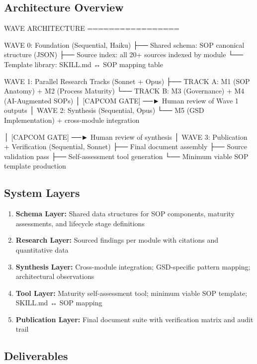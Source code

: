 \documentclass[11pt,letterpaper]{article}
\begin{document}
\subsection{Architecture Overview}

\begin{asciibox}
  WAVE ARCHITECTURE
  =================

  WAVE 0: Foundation (Sequential, Haiku)
  ├── Shared schema: SOP canonical structure (JSON)
  ├── Source index: all 20+ sources indexed by module
  └── Template library: SKILL.md ↔ SOP mapping table

  WAVE 1: Parallel Research Tracks (Sonnet + Opus)
  ├── TRACK A: M1 (SOP Anatomy) + M2 (Process Maturity)
  └── TRACK B: M3 (Governance) + M4 (AI-Augmented SOPs)
          │
      [CAPCOM GATE] ──► Human review of Wave 1 outputs
          │
  WAVE 2: Synthesis (Sequential, Opus)
  └── M5 (GSD Implementation) + cross-module integration

          │
      [CAPCOM GATE] ──► Human review of synthesis
          │
  WAVE 3: Publication + Verification (Sequential, Sonnet)
  ├── Final document assembly
  ├── Source validation pass
  ├── Self-assessment tool generation
  └── Minimum viable SOP template production
\end{asciibox}

\subsection{System Layers}

\begin{enumerate}[leftmargin=1.5em]
  \item \textbf{Schema Layer:} Shared data structures for SOP components, maturity assessments, and lifecycle stage definitions
  \item \textbf{Research Layer:} Sourced findings per module with citations and quantitative data
  \item \textbf{Synthesis Layer:} Cross-module integration; GSD-specific pattern mapping; architectural observations
  \item \textbf{Tool Layer:} Maturity self-assessment tool; minimum viable SOP template; SKILL.md ↔ SOP mapping
  \item \textbf{Publication Layer:} Final document suite with verification matrix and audit trail
\end{enumerate}

\subsection{Deliverables}
\end{document}
